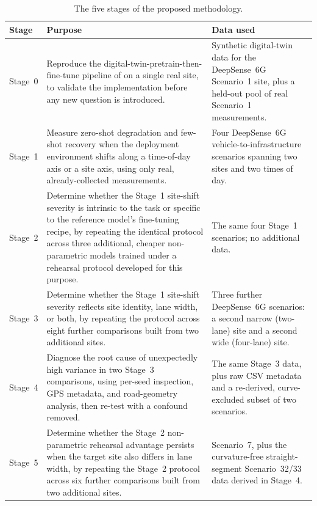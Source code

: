 \documentclass{iutbscthesis}
\begin{document}
\begin{table}[H]
    \centering
    \begin{tabular}{p{} p{} p{}}
        \toprule
        Stage & Purpose & Data used \\
        \midrule
        Stage~0 & Reproduce the digital-twin-pretrain-then-fine-tune pipeline of \textcite{jiang2023digitaltwinbeam} on a single real site, to validate the implementation before any new question is introduced. & Synthetic digital-twin data for the DeepSense~6G Scenario~1 site, plus a held-out pool of real Scenario~1 measurements. \\
        \midrule
        Stage~1 & Measure zero-shot degradation and few-shot recovery when the deployment environment shifts along a time-of-day axis or a site axis, using only real, already-collected measurements. & Four DeepSense~6G vehicle-to-infrastructure scenarios spanning two sites and two times of day. \\
        \midrule
        Stage~2 & Determine whether the Stage~1 site-shift severity is intrinsic to the task or specific to the reference model's fine-tuning recipe, by repeating the identical protocol across three additional, cheaper non-parametric models trained under a rehearsal protocol developed for this purpose. & The same four Stage~1 scenarios; no additional data. \\
        \midrule
        Stage~3 & Determine whether the Stage~1 site-shift severity reflects site identity, lane width, or both, by repeating the protocol across eight further comparisons built from two additional sites. & Three further DeepSense~6G scenarios: a second narrow (two-lane) site and a second wide (four-lane) site. \\
        \midrule
        Stage~4 & Diagnose the root cause of unexpectedly high variance in two Stage~3 comparisons, using per-seed inspection, GPS metadata, and road-geometry analysis, then re-test with a confound removed. & The same Stage~3 data, plus raw CSV metadata and a re-derived, curve-excluded subset of two scenarios. \\
        \midrule
        Stage~5 & Determine whether the Stage~2 non-parametric rehearsal advantage persists when the target site also differs in lane width, by repeating the Stage~2 protocol across six further comparisons built from two additional sites. & Scenario~7, plus the curvature-free straight-segment Scenario~32/33 data derived in Stage~4. \\
        \bottomrule
    \end{tabular}
    \caption{The five stages of the proposed methodology.}
    \label{tab:stages}
\end{table}
\end{document}
